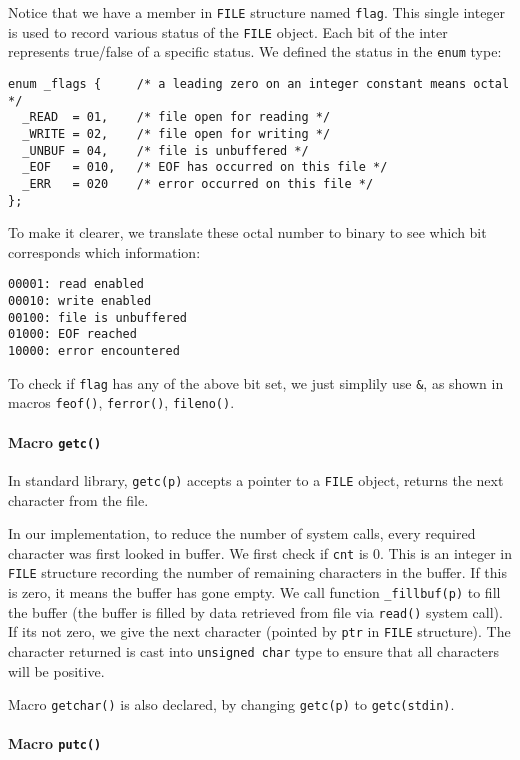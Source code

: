 \documentclass[12pt]{article}
\begin{document}
Notice that we have a member in \texttt{FILE} structure named \texttt{flag}. This single integer is used to record various status of the \texttt{FILE} object. Each bit of the inter represents true/false of a specific status. We defined the status in the \texttt{enum} type:
\begin{verbatim}
enum _flags {     /* a leading zero on an integer constant means octal */
  _READ  = 01,    /* file open for reading */
  _WRITE = 02,    /* file open for writing */
  _UNBUF = 04,    /* file is unbuffered */
  _EOF   = 010,   /* EOF has occurred on this file */
  _ERR   = 020    /* error occurred on this file */
};
\end{verbatim}

To make it clearer, we translate these octal number to binary to see which bit corresponds which information:
\begin{verbatim}
00001: read enabled
00010: write enabled
00100: file is unbuffered
01000: EOF reached
10000: error encountered
\end{verbatim}
To check if \texttt{flag} has any of the above bit set, we just simplily use \texttt{\&}, as shown in macros \texttt{feof()}, \texttt{ferror()}, \texttt{fileno()}.

\paragraph{Macro \texttt{getc()}}
\label{sec:org3818a4d}

In standard library, \texttt{getc(p)} accepts a pointer to a \texttt{FILE} object, returns the next character from the file.

In our implementation, to reduce the number of system calls, every required character was first looked in buffer. We first check if \texttt{cnt} is 0. This is an integer in \texttt{FILE} structure recording the number of remaining characters in the buffer. If this is zero, it means the buffer has gone empty. We call function \texttt{\_fillbuf(p)} to fill the buffer (the buffer is filled by data retrieved from file via \texttt{read()} system call). If its not zero, we give the next character (pointed by \texttt{ptr} in \texttt{FILE} structure). The character returned is cast into \texttt{unsigned char} type to ensure that all characters will be positive.

Macro \texttt{getchar()} is also declared, by changing \texttt{getc(p)} to \texttt{getc(stdin)}.

\paragraph{Macro \texttt{putc()}}
\label{sec:org4147b97}
\end{document}
